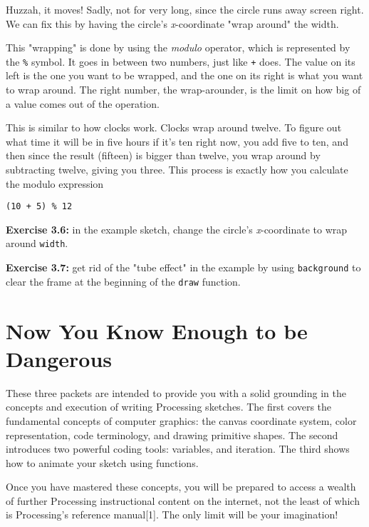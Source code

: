 \documentclass[
]{leaflet}
\begin{document}
Huzzah, it moves!
Sadly, not for very long, since the circle runs away screen right.
We can fix this by having the circle's \textit{x}-coordinate "wrap around" the width.

This "wrapping" is done by using the \textit{modulo} operator, which is represented by the \texttt{\%} symbol.
It goes in between two numbers, just like \texttt{+} does.
The value on its left is the one you want to be wrapped, and the one on its right is what you want to wrap around.
The right number, the wrap-arounder, is the limit on how big of a value comes out of the operation.

This is similar to how clocks work.
Clocks wrap around twelve.
To figure out what time it will be in five hours if it's ten right now, you add five to ten, and then since the result (fifteen) is bigger than twelve, you wrap around by subtracting twelve, giving you three.
This process is exactly how you calculate the modulo expression
\begin{lstlisting}
(10 + 5) % 12
\end{lstlisting}
\vspace{-0.5em}

\textbf{Exercise 3.6:} in the example sketch, change the circle's \textit{x}-coordinate to wrap around \texttt{width}.

\textbf{Exercise 3.7:} get rid of the "tube effect" in the example by using \texttt{background} to clear the frame at the beginning of the \texttt{draw} function.

\section{Now You Know Enough to be Dangerous}

These three packets are intended to provide you with a solid grounding in the concepts and execution of writing Processing sketches.
The first covers the fundamental concepts of computer graphics: the canvas coordinate system, color representation, code terminology, and drawing primitive shapes.
The second introduces two powerful coding tools: variables, and iteration.
The third shows how to animate your sketch using functions.

Once you have mastered these concepts, you will be prepared to access a wealth of further Processing instructional content on the internet, not the least of which is Processing's reference manual[1].
The only limit will be your imagination!



\loggingall
\end{document}
